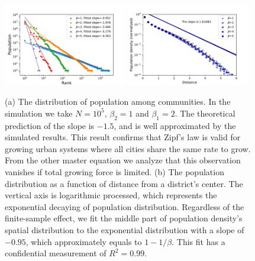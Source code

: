 \documentclass[reprint,unsortedaddress,amsmath,amssymb,aps,prl,showkeys]{revtex4-2}
\begin{document}
\begin{figure}[t]
    \centering
    \includegraphics[width=0.48\textwidth]{pics/zipf.pdf}
    \includegraphics[width=0.48\textwidth]{pics/kernal_density.pdf}
    \caption{(a) The distribution of population among communities. In the simulation we take $N = 10^5$, $\beta_2=1$ and $\beta_1 = 2$. The theoretical prediction of the slope is $-1.5$, and is well approximated by the simulated results. This result confirms that Zipf's law is valid for growing urban systems where all cities share the same rate to grow. From the other master equation we analyze that this observation vanishes if total growing force is limited. (b) The population distribution as a function of distance from a district's center. The vertical axis is logarithmic processed, which represents the exponential decaying of population distribution. Regardless of the finite-sample effect, we fit the middle part of population density's spatial distribution to the exponential distribution with a slope of $-0.95$, which approximately equals to $1-1/\beta$. This fit has a confidential measurement of $R^2=0.99$.}
    \label{fig:rankditribution}
    \label{fig:clark}
\end{figure}




\end{document}
